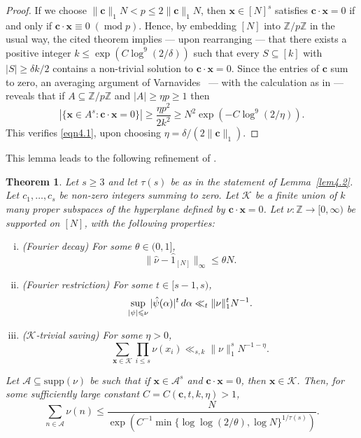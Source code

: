 \documentclass[12pt, reqno]{amsart}
\newtheorem{thm}{Theorem}[section]
\theoremstyle{definition}
\theoremstyle{remark}
\numberwithin{equation}{section}
\theoremstyle{definition}
\DeclareMathOperator{\Mod}{mod}
\newcommand{\mmod}[1]{\;(\Mod{ #1})}
\def\alp{{\alpha}} \def\bfalp{{\boldsymbol \alpha}}
\def\tet{{\theta}} \def\bftet{{\boldsymbol \theta}} \def\Tet{{\Theta}}
\def\le{\leqslant} \def\ge{\geqslant} \def\pleq{\preccurlyeq} \def\ple{\prec}
\def\d{{\,{\rm d}}}
\def \bZ {\mathbb Z}
\def \bc {\mathbf c}
\def \bx {\mathbf x}
\def \cA {\mathcal A}
\def \cK {\mathcal K}
\def \supp {{\mathrm{supp}}}
\def \Z {\mathbb{Z}}
\begin{document}
\begin{proof}
If we choose $\lVert \bc\rVert_1 N < p \le 2 \lVert \bc\rVert_1 N$, then $\bx\in[N]^s$ satisfies $\bc\cdot\bx=0$ if and only if $\bc\cdot\bx \equiv 0 \mmod{p}$. Hence, by embedding $[N]$ into $\Z/p\Z$ in the usual way, the cited theorem implies --- upon rearranging --- that there exists a positive integer $k \leqslant  \exp(C\log^{9}(2/\delta))$ such that every $S\subseteq[k]$ with $|S|\geqslant \delta k/2$ contains a non-trivial solution to $\bc\cdot\bx = 0$. Since the entries of $\bc$ sum to zero, an averaging argument of Varnavides~\cite{Var1959} --- with the calculation as in \cite[Proof of Lemma 6.8]{Gre2005} --- reveals that if $A \subseteq \bZ/p\bZ$ and $|A| \geqslant \eta p \ge 1$ then
\begin{equation*}
|\{\bx\in A^s: \bc\cdot\bx = 0\}| \geqslant \frac{\eta p^2}{2k^2} \geqslant N^2\exp(-C\log^{9}(2/\eta)).
\end{equation*}
This verifies \eqref{eqn4.1}, upon choosing $\eta = \delta/(2\|\bc\|_1)$.
\end{proof}

This lemma leads to the following refinement of \cite[Proposition 2.8]{BP2017}.

\begin{thm}
\label{thm4.3}
Let $s\geqslant 3$ and let $\tau(s)$ be as in the statement of Lemma~\ref{lem4.2}.
Let $c_1, \ldots, c_s$ be non-zero integers summing to zero. Let $\cK$ be a finite union of $k$ many proper subspaces of the hyperplane defined by $\bc \cdot \bx = 0$. Let $\nu: \bZ \to [0,\infty)$ be supported on $[N]$, with the following properties:
\begin{enumerate}[(i)]
\item (Fourier decay) For some $\tet \in (0,1]$,
\[
\| \hat \nu - \hat 1_{[N]} \|_\infty \le \tet N.
\]
\item (Fourier restriction) For some $t \in [s-1,s)$,
\[
\sup_{|\psi| \le \nu} |\hat \psi(\alp)|^t \d \alp \ll_t \| \nu \|_1^t N^{-1}.
\]
\item ($\cK$-trivial saving) For some $\eta > 0$,
\[
\sum_{\bx \in \cK} \prod_{i \le s} \nu(x_i) \ll_{s,k} \| \nu \|_1^s N^{-1-\eta}.
\]
\end{enumerate}
Let $\cA \subseteq \supp(\nu)$ be such that if $\bx \in \cA^s$ and $\bc \cdot \bx = 0$, then $\bx \in \cK$. Then, for some sufficiently large constant $C = C(\bc, t, k, \eta) > 1$,
\[
\sum_{n \in \cA} \nu(n) \le \frac{N}{\exp\left(C^{-1} \min\{\log\log (2/\theta), \log N\}^{1/\tau(s)}\right)}.
\]
\end{thm}
\end{document}
